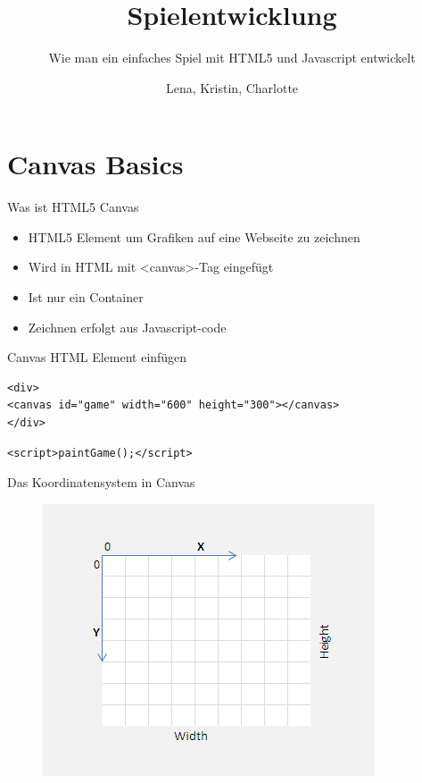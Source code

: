 \documentclass[18pt]{beamer}
\title[Javascript Basics]{Spielentwicklung}
\subtitle{Wie man ein einfaches Spiel mit HTML5 und Javascript entwickelt}
\author{Lena, Kristin, Charlotte}
\begin{document}

\begin{frame}
\titlepage
\end{frame}

\section{Canvas Basics}

\begin{frame}[fragile]{Was ist HTML5 Canvas}
\begin{itemize}
	\item HTML5 Element um Grafiken auf eine Webseite zu zeichnen
	\item Wird in HTML mit \textless canvas\textgreater  -Tag eingefügt 
	\item Ist nur ein Container 
	\item Zeichnen erfolgt aus Javascript-code
\end{itemize}
\end{frame}

\begin{frame}[fragile]{Canvas HTML Element einfügen}
\begin{lstlisting}
<div>
<canvas id="game" width="600" height="300"></canvas>
</div>
\end{lstlisting}
\begin{lstlisting}
<script>paintGame();</script>
\end{lstlisting}
\end{frame}

\begin{frame}{Das Koordinatensystem in Canvas}
\begin{figure}[htb]
	\centering
	\includegraphics{logos/canvascos}
\end{figure}
\end{frame}
\end{document}
